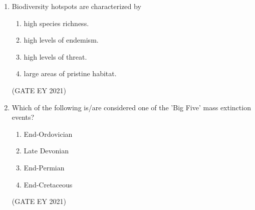 \documentclass[journal]{IEEEtran}
\begin{document}
\begin{enumerate}
    \item Biodiversity hotspots are characterized by
    \begin{enumerate}
        \item high species richness.
        \item high levels of endemism.
        \item high levels of threat.
        \item large areas of pristine habitat.
    \end{enumerate}
    \hfill{(GATE EY 2021)}

    \item Which of the following is/are considered one of the 'Big Five' mass extinction events?
    \begin{multicols}{2}
    \begin{enumerate}
        \item End-Ordovician
        \item Late Devonian
        \item End-Permian
        \item End-Cretaceous
    \end{enumerate}
    \end{multicols}
    \hfill{(GATE EY 2021)}
\end{enumerate}
\bigskip
{}
\end{document}
